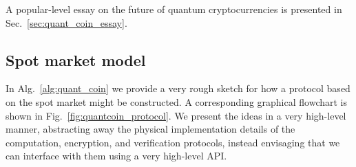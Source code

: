 A popular-level essay on the future of quantum cryptocurrencies is presented in Sec.~\ref{sec:quant_coin_essay}.

%
%

\subsection{Spot market model}

In Alg.~\ref{alg:quant_coin} we provide a very rough sketch for how a protocol based on the spot market might be constructed. A corresponding graphical flowchart is shown in Fig.~\ref{fig:quantcoin_protocol}. We present the ideas in a very high-level manner, abstracting away the physical implementation details of the computation, encryption, and verification protocols, instead envisaging that we can interface with them using a very high-level API.

